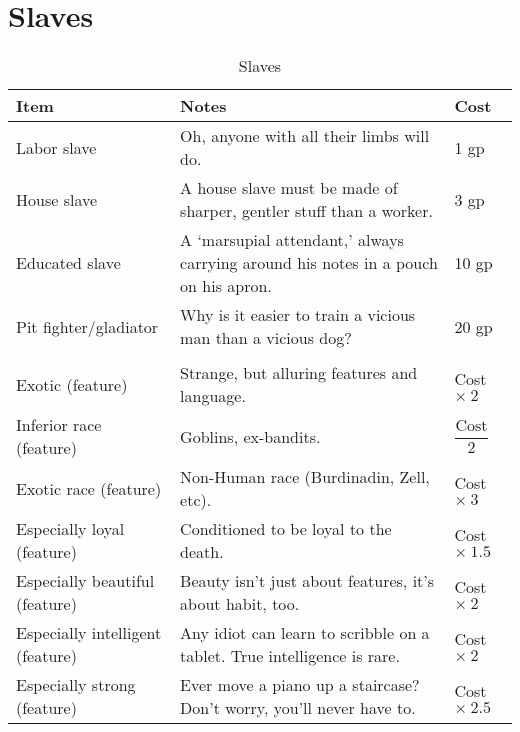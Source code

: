 \documentclass[oneside,11pt,english]{book}
\begin{document}
\section{Slaves}
\begin{table}[hb]
  \centering
  \caption{Slaves}
  \label{tab:Slaves}
  \begin{tabu} spread 0pt {*{3}{X[-1]}}
    Item                             & Notes                                                                              & Cost                       \\\toprule
    Labor slave                      & Oh, anyone with all their limbs will do.                                           & 1 gp                       \\
    House slave                      & A house slave must be made of sharper, gentler stuff than a worker.                & 3 gp                       \\
    Educated slave                   & A ‘marsupial attendant,’ always carrying around his notes in a pouch on his apron. & 10 gp                      \\
    Pit fighter/gladiator            & Why is it easier to train a vicious man than a vicious dog?                        & 20 gp                      \\
                                                                                                                                                       \\
    Exotic (feature)                 & Strange, but alluring features and language.                                       & Cost $\times\ 2 $          \\
    Inferior race (feature)          & Goblins, ex-bandits.                                                               & $ \dfrac{\text{Cost}}{2} $ \\
    Exotic race (feature)            & Non-Human race (Burdinadin, Zell, etc).                                            & Cost $ \times\ 3$          \\
    Especially loyal (feature)       & Conditioned to be loyal to the death.                                              & Cost $ \times\ 1.5 $       \\
    Especially beautiful (feature)   & Beauty isn’t just about features, it’s about habit, too.                           & Cost $ \times\ 2 $         \\
    Especially intelligent (feature) & Any idiot can learn to scribble on a tablet. True intelligence is rare.            & Cost $ \times\ 2 $         \\
    Especially strong (feature)      & Ever move a piano up a staircase? Don’t worry, you’ll never have to.               & Cost $ \times\ 2.5 $       \\
  \end{tabu}
\end{table}
\end{document}
